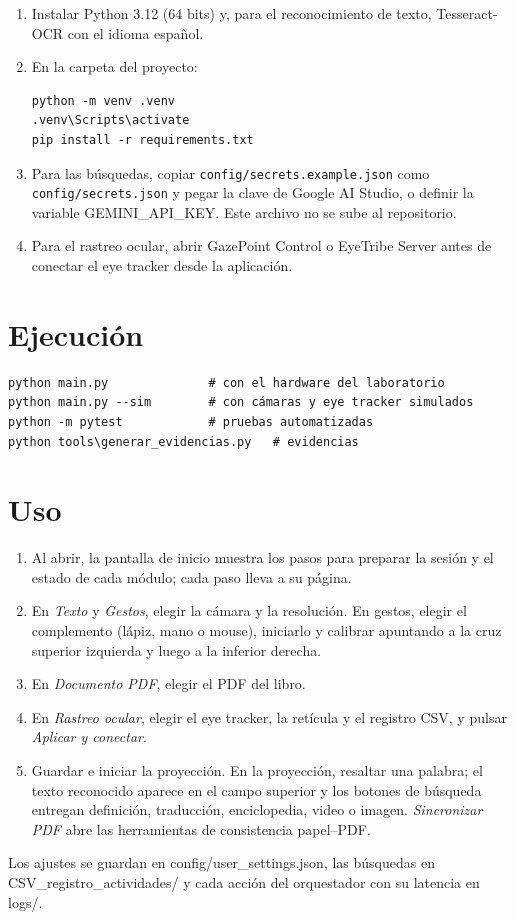 \begin{enumerate}
  \item Instalar Python 3.12 (64 bits) y, para el reconocimiento de texto, Tesseract-OCR con el idioma español.
  \item En la carpeta del proyecto:
\begin{verbatim}
python -m venv .venv
.venv\Scripts\activate
pip install -r requirements.txt
\end{verbatim}
  \item Para las búsquedas, copiar \nolinkurl{config/secrets.example.json} como \nolinkurl{config/secrets.json} y pegar la clave de Google AI Studio, o definir la variable GEMINI\_API\_KEY. Este archivo no se sube al repositorio.
  \item Para el rastreo ocular, abrir GazePoint Control o EyeTribe Server antes de conectar el eye tracker desde la aplicación.
\end{enumerate}

\section{Ejecución}

\begin{verbatim}
python main.py              # con el hardware del laboratorio
python main.py --sim        # con cámaras y eye tracker simulados
python -m pytest            # pruebas automatizadas
python tools\generar_evidencias.py   # evidencias
\end{verbatim}

\section{Uso}

\begin{enumerate}
  \item Al abrir, la pantalla de inicio muestra los pasos para preparar la sesión y el estado de cada módulo; cada paso lleva a su página.
  \item En \textit{Texto} y \textit{Gestos}, elegir la cámara y la resolución. En gestos, elegir el complemento (lápiz, mano o mouse), iniciarlo y calibrar apuntando a la cruz superior izquierda y luego a la inferior derecha.
  \item En \textit{Documento PDF}, elegir el PDF del libro.
  \item En \textit{Rastreo ocular}, elegir el eye tracker, la retícula y el registro CSV, y pulsar \textit{Aplicar y conectar}.
  \item Guardar e iniciar la proyección. En la proyección, resaltar una palabra; el texto reconocido aparece en el campo superior y los botones de búsqueda entregan definición, traducción, enciclopedia, video o imagen. \textit{Sincronizar PDF} abre las herramientas de consistencia papel--PDF.
\end{enumerate}

Los ajustes se guardan en config/user\_settings.json, las búsquedas en CSV\_registro\_actividades/ y cada acción del orquestador con su latencia en logs/.
